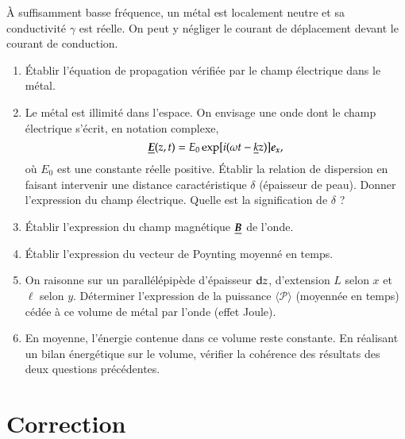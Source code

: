 \begin{exocor}
	À suffisamment basse fréquence, un métal est localement neutre et sa
	conductivité $\gamma$ est réelle. On peut y négliger le courant de 
	déplacement devant le courant de conduction.
	\begin{enumerate}
		\item Établir l'équation de propagation vérifiée par le champ
		 électrique dans le métal.
		\item Le métal est illimité dans l'espace. On envisage une 
		  onde dont le champ électrique s'écrit, en notation complexe, 
		  \begin{equation}
			  \complex{\vece}(z, t) = E_0 \exp[i(\omega t - \complex{k}z)]\ex,
		 \end{equation}
		 où $E_0$ est une constante réelle positive. Établir la relation
		 de dispersion en faisant intervenir une distance caractéristique 
		 $\delta$ (épaisseur de peau). Donner l'expression du champ 
		 électrique. Quelle est la signification de $\delta$ ?
	 \item Établir l'expression du champ magnétique $\complex{\vecb}$ de l'onde. 
		\item Établir l'expression du vecteur de Poynting moyenné en temps.
		\item On raisonne sur un parallélépipède d'épaisseur
		  $\mathrm{d}z$, d'extension $L$ selon $x$ et $\ell$ selon $y$. Déterminer
		  l'expression de la puissance $\langle \mathcal{P} \rangle$ 
		  (moyennée en temps)
		  cédée à ce volume de métal par l'onde (effet Joule).
		\item En moyenne, l'énergie contenue dans ce volume reste constante.
		  En réalisant un bilan énergétique sur le volume, vérifier 
		  la cohérence des résultats des deux questions précédentes.
	\end{enumerate}
\end{exocor}

\newpage

\section{Correction}

